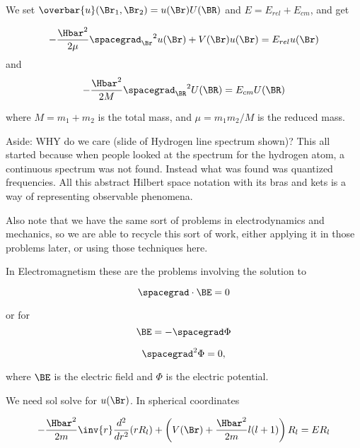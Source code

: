 We set \(\overbar{u}(\Br_1, \Br_2) = u(\Br) U(\BR)\) and \(E = E_{rel} + E_{cm}\), and get

\begin{equation}\label{eqn:PHY356FLecture10:10}
-\frac{\Hbar^2}{2\mu} {\spacegrad_{\Br}}^2 u(\Br) + V(\Br) u(\Br) = E_{rel} u(\Br)
\end{equation}
and
\begin{equation}\label{eqn:PHY356FLecture10:20}
-\frac{\Hbar^2}{2M} {\spacegrad_{\BR}}^2 U(\BR) = E_{cm} U(\BR)
\end{equation}

where \(M = m_1 + m_2\) is the total mass, and \(\mu = m_1 m_2/M\) is the reduced mass.

Aside: WHY do we care (slide of Hydrogen line spectrum shown)?  This all started because when people looked at the spectrum for the hydrogen atom, a continuous spectrum was not found.  Instead what was found was quantized frequencies.  All this abstract Hilbert space notation with its bras and kets is a way of representing observable phenomena.

Also note that we have the same sort of problems in electrodynamics and mechanics, so we are able to recycle this sort of work, either applying it in those problems later, or using those techniques here.

In Electromagnetism these are the problems involving the solution to

\begin{equation}\label{eqn:PHY356FLecture10:30}
\spacegrad \cdot \BE = 0
\end{equation}

or for
\begin{equation}\label{eqn:PHY356FLecture10:40}
\BE = - \spacegrad \Phi
\end{equation}


\begin{equation}\label{eqn:PHY356FLecture10:60}
\spacegrad^2 \Phi = 0,
\end{equation}

where \(\BE\) is the electric field and \(\Phi\) is the electric potential.


We need sol solve  for \(u(\Br)\).  In spherical coordinates

\begin{equation}\label{eqn:PHY356FLecture10:70}
-\frac{\Hbar^2}{2m} \inv{r} \frac{d^2}{dr^2} ( r R_l ) + \left( V(\Br) + \frac{\Hbar^2 }{2m} l(l+1) \right) R_l = E R_l
\end{equation}

